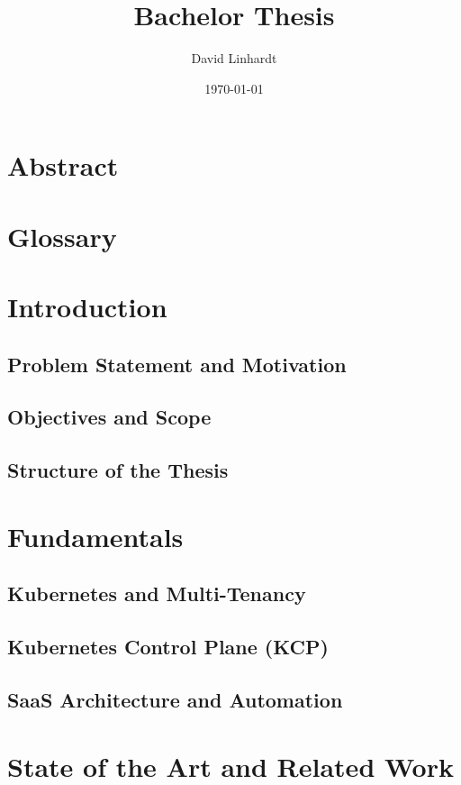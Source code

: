 \documentclass[11pt, a4paper, oneside]{scrartcl}
\title{Bachelor Thesis}
\author{David Linhardt}
\date{\today}
\begin{document}
    \section*{Abstract}

    \tableofcontents

        \newpage

    \section*{Glossary}

        \newpage

    \section{Introduction}

        \subsection{Problem Statement and Motivation}

        \subsection{Objectives and Scope}

        \subsection{Structure of the Thesis}

    \section{Fundamentals}

        \subsection{Kubernetes and Multi-Tenancy}

        \subsection{Kubernetes Control Plane (KCP)}

        \subsection{SaaS Architecture and Automation}

    \section{State of the Art and Related Work}
\end{document}
